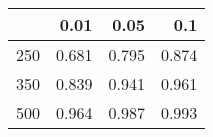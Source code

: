 % 
\begin{tabular}{rrrr}
  \hline
 & 0.01 & 0.05 & 0.1 \\ 
  \hline
250 & 0.681 & 0.795 & 0.874 \\ 
  350 & 0.839 & 0.941 & 0.961 \\ 
  500 & 0.964 & 0.987 & 0.993 \\ 
   \hline
\end{tabular}
